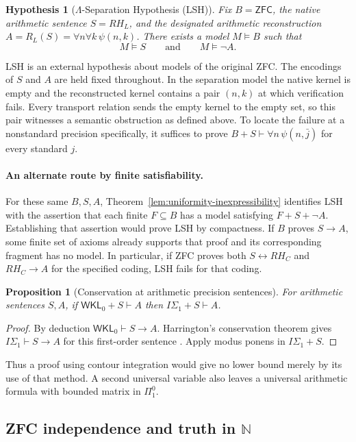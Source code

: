 \documentclass{article}
\newtheorem{proposition}[theorem]{Proposition}
\newtheorem{hypothesis}[theorem]{Hypothesis}
\theoremstyle{definition}
\begin{document}
\begin{hypothesis}[$\Lambda$-Separation Hypothesis (LSH)]
\label{def:lsh}
Fix $B=\mathsf{ZFC}$, the native arithmetic sentence $S=RH_L$, and the
designated arithmetic reconstruction $A=R_L(S)=\forall n\forall k\,\psi(n,k)$.
There exists a model $M\models B$ such that
\[
                 M\models S\qquad\text{and}\qquad M\models\neg A.
\]
\end{hypothesis}
LSH is an external hypothesis about models of the original ZFC. The
encodings of $S$ and $A$ are held fixed throughout. In the separation
model the native kernel is empty and the reconstructed kernel contains
a pair $(n,k)$ at which verification fails. Every transport relation
sends the empty kernel to the empty set, so this pair witnesses a
semantic obstruction as defined above. To locate the failure at a
nonstandard precision specifically, it suffices to prove
$B+S\vdash\forall n\,\psi(n,\bar j)$ for every standard $j$.

\paragraph{An alternate route by finite satisfiability.}
For these same $B,S,A$, Theorem~\ref{lem:uniformity-inexpressibility}
identifies LSH with the assertion that each finite $F\subseteq B$ has
a model satisfying $F+S+\neg A$. Establishing that assertion would
prove LSH by compactness. If $B$ proves $S\to A$, some finite set of
axioms already supports that proof and its corresponding fragment has
no model. In particular, if ZFC proves both $S\leftrightarrow RH_C$
and $RH_C\to A$ for the specified coding, LSH fails for that coding.

\begin{proposition}[Conservation at arithmetic precision sentences]
For arithmetic sentences $S,A$, if $\mathsf{WKL}_0+S\vdash A$ then
$I\Sigma_1+S\vdash A$.
\end{proposition}
\begin{proof}
By deduction $\mathsf{WKL}_0\vdash S\to A$. Harrington's conservation
theorem gives $I\Sigma_1\vdash S\to A$ for this first-order sentence
\cite[Theorem~7.8]{Hirschfeldt}. Apply modus ponens in $I\Sigma_1+S$.
\end{proof}
Thus a proof using contour integration would give no lower bound merely
by its use of that method. A second universal variable also leaves a
universal arithmetic formula with bounded matrix in $\Pi^0_1$.

\subsection{ZFC independence and truth in \texorpdfstring{$\mathbb N$}{N}}
\label{sec:lsh-consequences}
\end{document}
